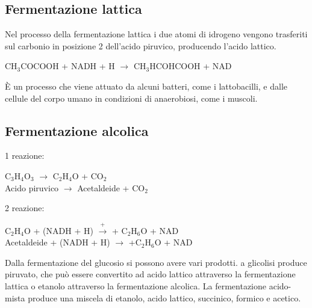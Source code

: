 \subsection{Fermentazione lattica}
Nel processo della fermentazione lattica i due atomi di idrogeno vengono trasferiti sul carbonio in posizione 2 dell'acido piruvico, producendo l'acido lattico.
\\\begin{center}CH$_3$COCOOH\ap{-} + NADH + H\ap{+} $\xrightarrow{}$ CH$_3$HCOHCOOH + NAD\ap{+}\end{center} 
\`E un processo che viene attuato da alcuni batteri, come i lattobacilli, e dalle cellule del corpo umano in condizioni di anaerobiosi, come i muscoli. 
\subsection{Fermentazione alcolica}
1 reazione:
\begin{center}
    C$_3$H$_4$O$_3$ $\xrightarrow{}$ C$_2$H$_4$O + CO$_2$
    \\Acido piruvico $\xrightarrow{}$ Acetaldeide + CO$_2$
\end{center}
2 reazione:
\begin{center}
    C$_2$H$_4$O + (NADH + H\ap{+}) $\xrightarrow{+}$ + C$_2$H$_6$O + NAD\ap{+}
    \\Acetaldeide + (NADH + H\ap{+}) $\xrightarrow{}$ +C$_2$H$_6$O + NAD\ap{+} 
\end{center}
Dalla fermentazione del glucosio si possono avere vari prodotti. a glicolisi produce piruvato, che pu\`o essere convertito ad acido lattico attraverso la fermentazione lattica o etanolo attraverso la fermentazione alcolica. La fermentazione acido-mista produce una miscela di etanolo, acido lattico, succinico, formico e acetico.
